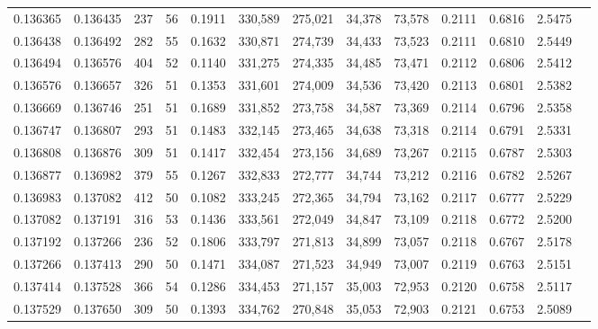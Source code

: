 \begin{tabular}{rrrrrrrrrrrrr}
0.136365 & 0.136435 &   237 &  56 &                                     0.1911 & 330,589 & 275,021 &  34,378 &  73,578 & 0.2111 & 0.6816 & 2.5475 \\
0.136438 & 0.136492 &   282 &  55 &                                     0.1632 & 330,871 & 274,739 &  34,433 &  73,523 & 0.2111 & 0.6810 & 2.5449 \\
0.136494 & 0.136576 &   404 &  52 &                                     0.1140 & 331,275 & 274,335 &  34,485 &  73,471 & 0.2112 & 0.6806 & 2.5412 \\
0.136576 & 0.136657 &   326 &  51 &                                     0.1353 & 331,601 & 274,009 &  34,536 &  73,420 & 0.2113 & 0.6801 & 2.5382 \\
0.136669 & 0.136746 &   251 &  51 &                                     0.1689 & 331,852 & 273,758 &  34,587 &  73,369 & 0.2114 & 0.6796 & 2.5358 \\
0.136747 & 0.136807 &   293 &  51 &                                     0.1483 & 332,145 & 273,465 &  34,638 &  73,318 & 0.2114 & 0.6791 & 2.5331 \\
0.136808 & 0.136876 &   309 &  51 &                                     0.1417 & 332,454 & 273,156 &  34,689 &  73,267 & 0.2115 & 0.6787 & 2.5303 \\
0.136877 & 0.136982 &   379 &  55 &                                     0.1267 & 332,833 & 272,777 &  34,744 &  73,212 & 0.2116 & 0.6782 & 2.5267 \\
0.136983 & 0.137082 &   412 &  50 &                                     0.1082 & 333,245 & 272,365 &  34,794 &  73,162 & 0.2117 & 0.6777 & 2.5229 \\
0.137082 & 0.137191 &   316 &  53 &                                     0.1436 & 333,561 & 272,049 &  34,847 &  73,109 & 0.2118 & 0.6772 & 2.5200 \\
0.137192 & 0.137266 &   236 &  52 &                                     0.1806 & 333,797 & 271,813 &  34,899 &  73,057 & 0.2118 & 0.6767 & 2.5178 \\
0.137266 & 0.137413 &   290 &  50 &                                     0.1471 & 334,087 & 271,523 &  34,949 &  73,007 & 0.2119 & 0.6763 & 2.5151 \\
0.137414 & 0.137528 &   366 &  54 &                                     0.1286 & 334,453 & 271,157 &  35,003 &  72,953 & 0.2120 & 0.6758 & 2.5117 \\
0.137529 & 0.137650 &   309 &  50 &                                     0.1393 & 334,762 & 270,848 &  35,053 &  72,903 & 0.2121 & 0.6753 & 2.5089 \\

\end{tabular}
